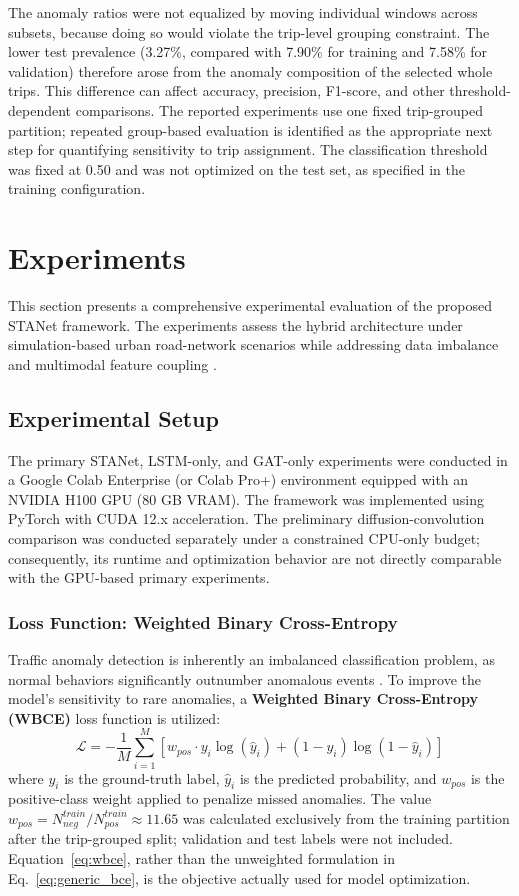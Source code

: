 \documentclass[journal]{IEEEtran}
\begin{document}
The anomaly ratios were not equalized by moving individual windows across subsets, because doing so would violate the trip-level grouping constraint. The lower test prevalence (3.27\%, compared with 7.90\% for training and 7.58\% for validation) therefore arose from the anomaly composition of the selected whole trips. This difference can affect accuracy, precision, F1-score, and other threshold-dependent comparisons. The reported experiments use one fixed trip-grouped partition; repeated group-based evaluation is identified as the appropriate next step for quantifying sensitivity to trip assignment. The classification threshold was fixed at 0.50 and was not optimized on the test set, as specified in the training configuration.

\section{Experiments}

This section presents a comprehensive experimental evaluation of the proposed STANet framework. The experiments assess the hybrid architecture under simulation-based urban road-network scenarios while addressing data imbalance and multimodal feature coupling \cite{feng_traffic_2024, guo_crfpi-net_2026}.

\subsection{Experimental Setup}
The primary STANet, LSTM-only, and GAT-only experiments were conducted in a Google Colab Enterprise (or Colab Pro+) environment equipped with an NVIDIA H100 GPU (80 GB VRAM). The framework was implemented using PyTorch with CUDA 12.x acceleration. The preliminary diffusion-convolution comparison was conducted separately under a constrained CPU-only budget; consequently, its runtime and optimization behavior are not directly comparable with the GPU-based primary experiments.

\subsubsection{Loss Function: Weighted Binary Cross-Entropy}
Traffic anomaly detection is inherently an imbalanced classification problem, as normal behaviors significantly outnumber anomalous events \cite{liang_anomaly_2025, ma_utfp-ad_2025}. To improve the model’s sensitivity to rare anomalies, a \textbf{Weighted Binary Cross-Entropy (WBCE)} loss function is utilized:
\begin{equation}
  \label{eq:wbce}
  \mathcal{L} = -\frac{1}{M} \sum_{i=1}^{M} [w_{pos} \cdot y_i \log(\hat{y}_i) + (1 - y_i) \log(1 - \hat{y}_i)]
\end{equation}
where $y_i$ is the ground-truth label, $\hat{y}_i$ is the predicted probability, and $w_{pos}$ is the positive-class weight applied to penalize missed anomalies. The value $w_{pos}=N_{neg}^{train}/N_{pos}^{train}\approx11.65$ was calculated exclusively from the training partition after the trip-grouped split; validation and test labels were not included. Equation~\ref{eq:wbce}, rather than the unweighted formulation in Eq.~\ref{eq:generic_bce}, is the objective actually used for model optimization.
\end{document}
